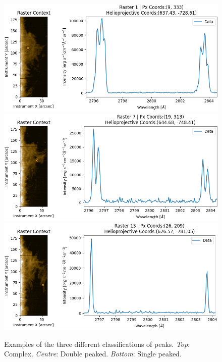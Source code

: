 \begin{figure} 
    \centering
    \includegraphics[width=0.8\linewidth]{./01Observations/figs/complex.png}
    \includegraphics[width=0.8\linewidth]{./01Observations/figs/double.png}
    \includegraphics[width=0.8\linewidth]{./01Observations/figs/single.png}
    \caption{Examples of the three different classifications of peaks. \textit{Top}: Complex. \textit{Centre}: Double peaked. \textit{Bottom}: Single peaked.}
    \label{threespectratypes}
\end{figure}

